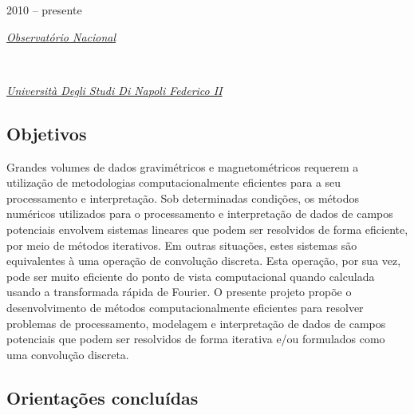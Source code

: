 2010 -- presente
\vspace{0.3\baselineskip}\\
\noindent\parbox{0.03\textwidth}{\vspace{-0.2\baselineskip}\faUniversity} \href{https://www.gov.br/observatorio/pt-br}{\textsl{Observatório Nacional}}
\parbox{0.03\textwidth}{\vspace{-0.2\baselineskip} \hfill {}} \\
\noindent\parbox{0.03\textwidth}{\vspace{-0.2\baselineskip}\faUniversity}
\href{https://www.unina.it/home}{\textsl{Università Degli Studi Di Napoli Federico II}}
\parbox{0.03\textwidth}{\vspace{-0.2\baselineskip} \hfill {}}

\subsection*{Objetivos}

Grandes volumes de dados gravimétricos e magnetométricos requerem a utilização de 
metodologias computacionalmente eficientes para a seu processamento e interpretação. 
Sob determinadas condições, os métodos numéricos utilizados para o processamento e 
interpretação de dados de campos potenciais envolvem sistemas lineares que podem 
ser resolvidos de forma eficiente, por meio de métodos iterativos. Em outras situações, 
estes sistemas são equivalentes à uma operação de convolução discreta. Esta operação, 
por sua vez, pode ser muito eficiente do ponto de vista computacional quando calculada 
usando a transformada rápida de Fourier. O presente projeto propõe o desenvolvimento 
de métodos computacionalmente eficientes para resolver problemas de processamento, 
modelagem e interpretação de dados de campos potenciais que podem ser resolvidos de 
forma iterativa e/ou formulados como uma convolução discreta. 

\subsection*{Orientações concluídas}

